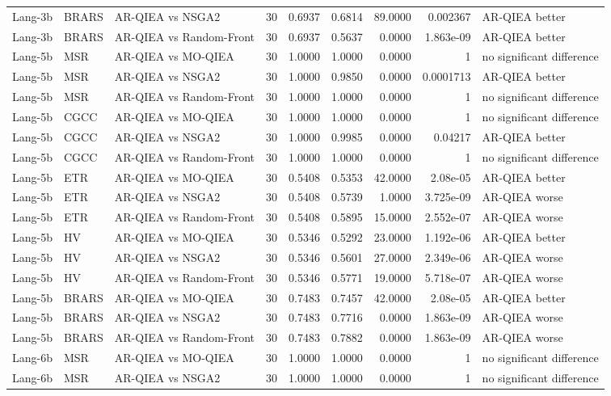 \begin{tabular}{lllrrrrrl}
Lang-3b & BRARS & AR-QIEA vs NSGA2 & 30 & 0.6937 & 0.6814 & 89.0000 & 0.002367 & AR-QIEA better \\
Lang-3b & BRARS & AR-QIEA vs Random-Front & 30 & 0.6937 & 0.5637 & 0.0000 & 1.863e-09 & AR-QIEA better \\
Lang-5b & MSR & AR-QIEA vs MO-QIEA & 30 & 1.0000 & 1.0000 & 0.0000 & 1 & no significant difference \\
Lang-5b & MSR & AR-QIEA vs NSGA2 & 30 & 1.0000 & 0.9850 & 0.0000 & 0.0001713 & AR-QIEA better \\
Lang-5b & MSR & AR-QIEA vs Random-Front & 30 & 1.0000 & 1.0000 & 0.0000 & 1 & no significant difference \\
Lang-5b & CGCC & AR-QIEA vs MO-QIEA & 30 & 1.0000 & 1.0000 & 0.0000 & 1 & no significant difference \\
Lang-5b & CGCC & AR-QIEA vs NSGA2 & 30 & 1.0000 & 0.9985 & 0.0000 & 0.04217 & AR-QIEA better \\
Lang-5b & CGCC & AR-QIEA vs Random-Front & 30 & 1.0000 & 1.0000 & 0.0000 & 1 & no significant difference \\
Lang-5b & ETR & AR-QIEA vs MO-QIEA & 30 & 0.5408 & 0.5353 & 42.0000 & 2.08e-05 & AR-QIEA better \\
Lang-5b & ETR & AR-QIEA vs NSGA2 & 30 & 0.5408 & 0.5739 & 1.0000 & 3.725e-09 & AR-QIEA worse \\
Lang-5b & ETR & AR-QIEA vs Random-Front & 30 & 0.5408 & 0.5895 & 15.0000 & 2.552e-07 & AR-QIEA worse \\
Lang-5b & HV & AR-QIEA vs MO-QIEA & 30 & 0.5346 & 0.5292 & 23.0000 & 1.192e-06 & AR-QIEA better \\
Lang-5b & HV & AR-QIEA vs NSGA2 & 30 & 0.5346 & 0.5601 & 27.0000 & 2.349e-06 & AR-QIEA worse \\
Lang-5b & HV & AR-QIEA vs Random-Front & 30 & 0.5346 & 0.5771 & 19.0000 & 5.718e-07 & AR-QIEA worse \\
Lang-5b & BRARS & AR-QIEA vs MO-QIEA & 30 & 0.7483 & 0.7457 & 42.0000 & 2.08e-05 & AR-QIEA better \\
Lang-5b & BRARS & AR-QIEA vs NSGA2 & 30 & 0.7483 & 0.7716 & 0.0000 & 1.863e-09 & AR-QIEA worse \\
Lang-5b & BRARS & AR-QIEA vs Random-Front & 30 & 0.7483 & 0.7882 & 0.0000 & 1.863e-09 & AR-QIEA worse \\
Lang-6b & MSR & AR-QIEA vs MO-QIEA & 30 & 1.0000 & 1.0000 & 0.0000 & 1 & no significant difference \\
Lang-6b & MSR & AR-QIEA vs NSGA2 & 30 & 1.0000 & 1.0000 & 0.0000 & 1 & no significant difference \\

\end{tabular}

